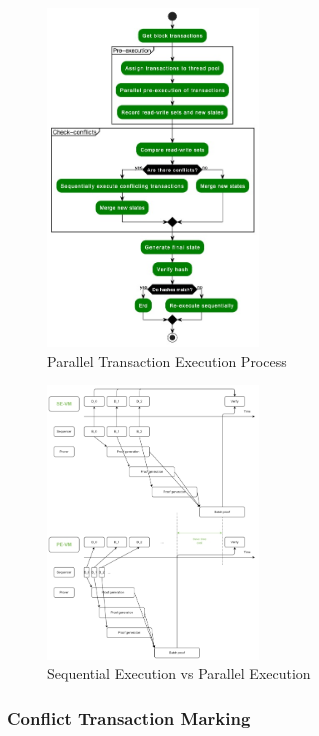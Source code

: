 \begin{figure}[!ht]
    \centering
    \includegraphics[width=0.5\textwidth]{images/paralle-execution.jpg}
    \caption{Parallel Transaction Execution Process}
    \label{fig:paralle-execution}
\end{figure}

\begin{figure}[!ht]
    \centering
    \includegraphics[width=0.5\textwidth]{images/se-vs-pe.jpg}
    \caption{Sequential Execution vs Parallel Execution}
    \label{fig:se-vs-pe}
\end{figure}

\subsubsection{Conflict Transaction Marking}


